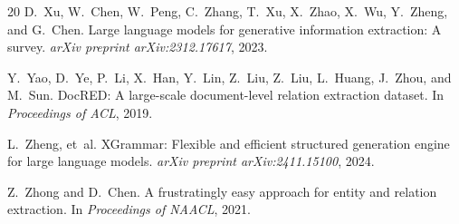 \documentclass[11pt]{article}
\begin{document}
\begin{thebibliography}{20}
D.~Xu, W.~Chen, W.~Peng, C.~Zhang, T.~Xu, X.~Zhao, X.~Wu, Y.~Zheng, and G.~Chen.
\newblock Large language models for generative information extraction: A survey.
\newblock \emph{arXiv preprint arXiv:2312.17617}, 2023.

Y.~Yao, D.~Ye, P.~Li, X.~Han, Y.~Lin, Z.~Liu, Z.~Liu, L.~Huang, J.~Zhou, and M.~Sun.
\newblock DocRED: A large-scale document-level relation extraction dataset.
\newblock In \emph{Proceedings of ACL}, 2019.

L.~Zheng, et~al.
\newblock XGrammar: Flexible and efficient structured generation engine for large language models.
\newblock \emph{arXiv preprint arXiv:2411.15100}, 2024.

Z.~Zhong and D.~Chen.
\newblock A frustratingly easy approach for entity and relation extraction.
\newblock In \emph{Proceedings of NAACL}, 2021.

\end{thebibliography}
\end{document}
